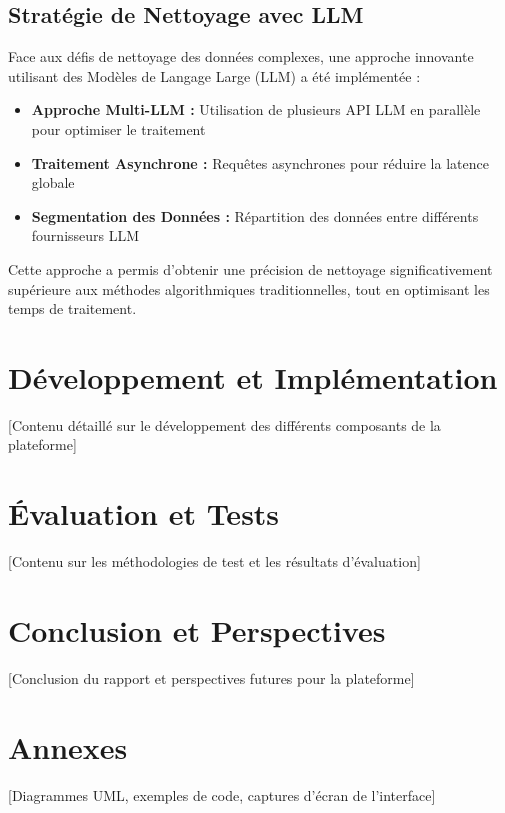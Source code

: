 \documentclass[12pt, a4paper]{report}
\begin{document}
\section{Stratégie de Nettoyage avec LLM}
Face aux défis de nettoyage des données complexes, une approche innovante utilisant des Modèles de Langage Large (LLM) a été implémentée :
\begin{itemize}
  \item \textbf{Approche Multi-LLM :} Utilisation de plusieurs API LLM en parallèle pour optimiser le traitement
  \item \textbf{Traitement Asynchrone :} Requêtes asynchrones pour réduire la latence globale
  \item \textbf{Segmentation des Données :} Répartition des données entre différents fournisseurs LLM
\end{itemize}

Cette approche a permis d'obtenir une précision de nettoyage significativement supérieure aux méthodes algorithmiques traditionnelles, tout en optimisant les temps de traitement.

\chapter{Développement et Implémentation}
\thispagestyle{fancy}
[Contenu détaillé sur le développement des différents composants de la plateforme]

\chapter{Évaluation et Tests}
\thispagestyle{fancy}
[Contenu sur les méthodologies de test et les résultats d'évaluation]

\chapter{Conclusion et Perspectives}
\thispagestyle{fancy}
[Conclusion du rapport et perspectives futures pour la plateforme]

\appendix
\chapter{Annexes}
\thispagestyle{fancy}
[Diagrammes UML, exemples de code, captures d'écran de l'interface]
\end{document}
